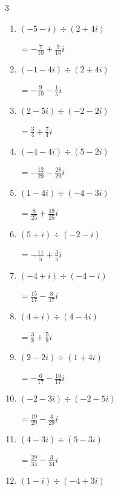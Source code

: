 \begin{multicols}{3}
\begin{enumerate}
  \item $\displaystyle (-5-i)\div(2+4i)$

        $\displaystyle =-\frac{7}{10}+\frac{9}{10}i$

  \item $\displaystyle (-1-4i)\div(2+4i)$

        $\displaystyle =-\frac{9}{10}-\frac{1}{5}i$

  \item $\displaystyle (2-5i)\div(-2-2i)$

        $\displaystyle =\frac{3}{4}+\frac{7}{4}i$

  \item $\displaystyle (-4-4i)\div(5-2i)$

        $\displaystyle =-\frac{12}{29}-\frac{28}{29}i$

  \item $\displaystyle (1-4i)\div(-4-3i)$

        $\displaystyle =\frac{8}{25}+\frac{19}{25}i$

  \item $\displaystyle (5+i)\div(-2-i)$

        $\displaystyle =-\frac{11}{5}+\frac{3}{5}i$

  \item $\displaystyle (-4+i)\div(-4-i)$

        $\displaystyle =\frac{15}{17}-\frac{8}{17}i$

\columnbreak %

\resetques

  \item $\displaystyle (4+i)\div(4-4i)$

        $\displaystyle =\frac{3}{8}+\frac{5}{8}i$

  \item $\displaystyle (2-2i)\div(1+4i)$

        $\displaystyle =-\frac{6}{17}-\frac{10}{17}i$

  \item $\displaystyle (-2-3i)\div(-2-5i)$

        $\displaystyle =\frac{19}{29}-\frac{4}{29}i$

  \item $\displaystyle (4-3i)\div(5-3i)$

        $\displaystyle =\frac{29}{34}-\frac{3}{34}i$

  \item $\displaystyle (1-i)\div(-4+3i)$


\end{enumerate}
\end{multicols}
